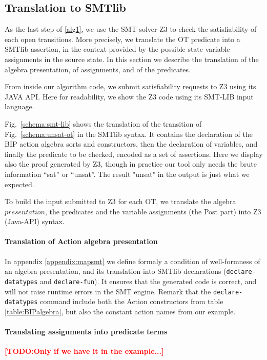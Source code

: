 \documentclass{lncs/llncs}
\newcommand{\TODO}[1]{\textcolor{red}{\textbf{[TODO:#1]}}}
\begin{document}
\subsection{Translation to SMTlib}

As the last step of \ref{alg1}, we use the SMT solver Z3 to check the
satisfiability of each open transitions. More precisely, we translate
the OT predicate into a SMTlib assertion, in the context provided by
the possible state variable assignments in the source state. In this
section we describe the translation of the algebra presentation, of
assignments, and of the predicates.

From inside our algorithm code, we submit satisfiability requests to
Z3 using its JAVA API. Here for readability, we
show the Z3 code using its SMT-LIB input language.

Fig.~\ref{schema:smt-lib} shows the translation of the
transition of Fig.~\ref{schema:unsat-ot}
in the SMTlib syntax.
It contains the declaration
of the BIP action algebra sorts 
and constructors, then the declaration of variables, and finally the
predicate to be checked, encoded as a set of assertions.
Here we display also the proof generated by Z3,
though in practice our tool only needs the brute information ``sat''
or ``unsat''. The result "unsat" in the output is just what we expected.   

To build the input submitted to Z3 for each OT,
we translate the algebra $presentation$, the predicates and the
variable assignments (the Post part) into Z3 (Java-API) syntax.

\paragraph{Translation of Action algebra presentation}
In appendix \ref{appendix:mapsmt} we define formaly a condition of
well-formness of an algebra presentation, and its translation into
SMTlib declarations (\texttt{declare-datatypes} and
\texttt{declare-fun}). It ensures that the generated code is correct,
and will not raise runtime errors in the SMT engine. Remark that the
\texttt{declare-datatypes} command include both the Action
constructors from table \ref{table:BIPalgebra}, but also the constant action
names from our example.


\paragraph{Translating assignments into predicate terms}
\TODO{Only if we have it in the example...}
\end{document}
